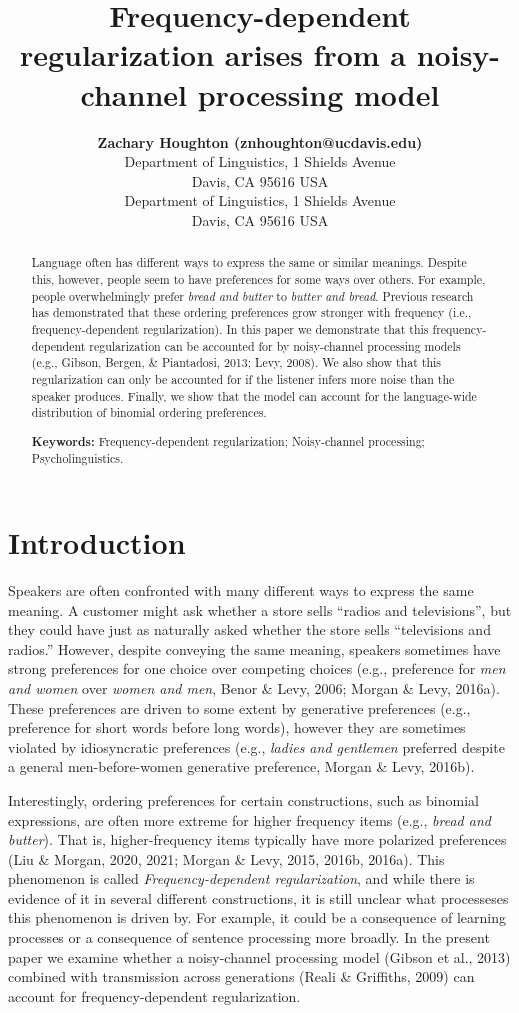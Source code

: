 \documentclass[10pt, letterpaper]{article}
\title{Frequency-dependent regularization arises from a noisy-channel
processing model}
\author{{\large \bf Zachary Houghton (znhoughton@ucdavis.edu)} \\ Department of Linguistics, 1 Shields Avenue \\ Davis, CA 95616 USA \AND {\large \bf Emily Morgan (eimorgan@ucdavis.edu)} \\ Department of Linguistics, 1 Shields Avenue \\ Davis, CA 95616 USA}
\begin{document}
\maketitle

\begin{abstract}
Language often has different ways to express the same or similar
meanings. Despite this, however, people seem to have preferences for
some ways over others. For example, people overwhelmingly prefer
\emph{bread and butter} to \emph{butter and bread}. Previous research
has demonstrated that these ordering preferences grow stronger with
frequency (i.e., frequency-dependent regularization). In this paper we
demonstrate that this frequency-dependent regularization can be
accounted for by noisy-channel processing models (e.g., Gibson, Bergen,
\& Piantadosi, 2013; Levy, 2008). We also show that this regularization
can only be accounted for if the listener infers more noise than the
speaker produces. Finally, we show that the model can account for the
language-wide distribution of binomial ordering preferences.

\textbf{Keywords:}
Frequency-dependent regularization; Noisy-channel processing;
Psycholinguistics.
\end{abstract}

\hypertarget{introduction}{%
\section{Introduction}\label{introduction}}

Speakers are often confronted with many different ways to express the
same meaning. A customer might ask whether a store sells ``radios and
televisions'', but they could have just as naturally asked whether the
store sells ``televisions and radios.'' However, despite conveying the
same meaning, speakers sometimes have strong preferences for one choice
over competing choices (e.g., preference for \emph{men and women} over
\emph{women and men}, Benor \& Levy, 2006; Morgan \& Levy, 2016a). These
preferences are driven to some extent by generative preferences (e.g.,
preference for short words before long words), however they are
sometimes violated by idiosyncratic preferences (e.g., \emph{ladies and
gentlemen} preferred despite a general men-before-women generative
preference, Morgan \& Levy, 2016b).

Interestingly, ordering preferences for certain constructions, such as
binomial expressions, are often more extreme for higher frequency items
(e.g., \emph{bread and butter}). That is, higher-frequency items
typically have more polarized preferences (Liu \& Morgan, 2020, 2021;
Morgan \& Levy, 2015, 2016b, 2016a). This phenomenon is called
\emph{Frequency-dependent regularization}, and while there is evidence
of it in several different constructions, it is still unclear what
processeses this phenomenon is driven by. For example, it could be a
consequence of learning processes or a consequence of sentence
processing more broadly. In the present paper we examine whether a
noisy-channel processing model (Gibson et al., 2013) combined with
transmission across generations (Reali \& Griffiths, 2009) can account
for frequency-dependent regularization.
\end{document}
